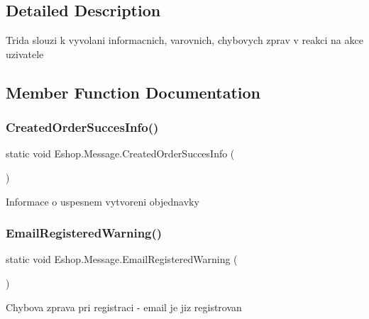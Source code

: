 \subsection{Detailed Description}
Trida slouzi k vyvolani informacnich, varovnich, chybovych zprav v reakci na akce uzivatele 



\subsection{Member Function Documentation}
\mbox{\label{class_eshop_1_1_message_a30072f121d6e675a3a811155c6e255c1}} 
\subsubsection{\texorpdfstring{CreatedOrderSuccesInfo()}{CreatedOrderSuccesInfo()}}
{\footnotesize\ttfamily static void Eshop.\+Message.\+Created\+Order\+Succes\+Info (\begin{DoxyParamCaption}{ }\end{DoxyParamCaption})\hspace{0.3cm}{\ttfamily [static]}}



Informace o uspesnem vytvoreni objednavky 

\mbox{\label{class_eshop_1_1_message_aa0408274ba9f49a4083f9b92e0750613}} 
\subsubsection{\texorpdfstring{EmailRegisteredWarning()}{EmailRegisteredWarning()}}
{\footnotesize\ttfamily static void Eshop.\+Message.\+Email\+Registered\+Warning (\begin{DoxyParamCaption}{ }\end{DoxyParamCaption})\hspace{0.3cm}{\ttfamily [static]}}



Chybova zprava pri registraci -\/ email je jiz registrovan 

